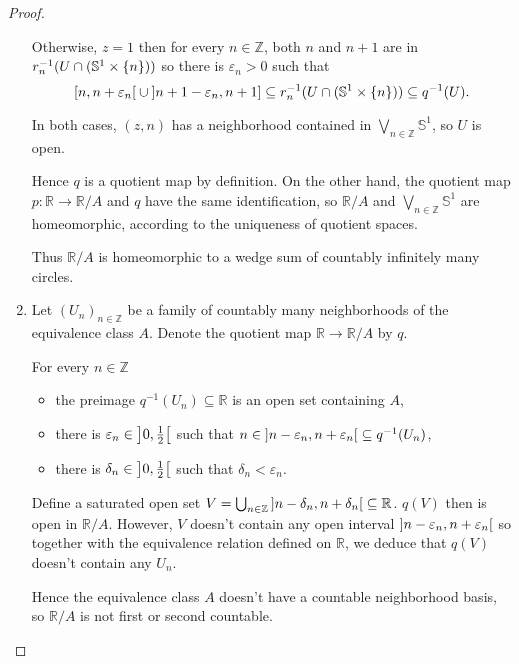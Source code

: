 \begin{proof}
\begin{enumerate}[label={(\alph*)}]
		      Otherwise, $z = 1$ then for every $n\in\mathbb{Z}$, both $n$ and $n+1$ are in $r_{n}^{-1}(U \cap (\mathbb{S}^{1}\times\left\{{n}\right\}))$ so there is $\varepsilon_{n} > 0$ such that
		      \begin{equation*}
			      \left[{n, n + \varepsilon_{n}}\right[ \cup \left]{n+1 - \varepsilon_{n}, n+1}\right] \subseteq r_{n}^{-1}(U \cap (\mathbb{S}^{1}\times\left\{{n}\right\})) \subseteq q^{-1}(U).
		      \end{equation*}

		      In both cases, $(z, n)$ has a neighborhood contained in $\bigvee_{n\in\mathbb{Z}}\mathbb{S}^{1}$, so $U$ is open.

		      Hence $q$ is a quotient map by definition. On the other hand, the quotient map $p: \mathbb{R} \to \mathbb{R}/A$ and $q$ have the same identification, so $\mathbb{R}/A$ and $\bigvee_{n\in \mathbb{Z}}\mathbb{S}^{1}$ are homeomorphic, according to the uniqueness of quotient spaces.

		      Thus $\mathbb{R}/A$ is homeomorphic to a wedge sum of countably infinitely many circles.
		\item Let ${(U_{n})}_{n\in\mathbb{Z}}$ be a family of countably many neighborhoods of the equivalence class $A$. Denote the quotient map $\mathbb{R}\to \mathbb{R}/A$ by $q$.

		      For every $n\in\mathbb{Z}$
		      \begin{itemize}
			      \item the preimage $q^{-1}(U_{n}) \subseteq \mathbb{R}$ is an open set containing $A$,
			      \item there is $\varepsilon_{n} \in \left]{0, \frac{1}{2}}\right[$ such that $n \in \left]{n - \varepsilon_{n}, n + \varepsilon_{n}}\right[ \subseteq q^{-1}(U_{n})$,
			      \item there is $\delta_{n} \in \left]{0, \frac{1}{2}}\right[$ such that $\delta_{n} < \varepsilon_{n}$.
		      \end{itemize}

		      Define a saturated open set $V = \bigcup_{n\in\mathbb{Z}} \left]{n - \delta_{n}, n + \delta_{n}}\right[ \subseteq \mathbb{R}$. $q(V)$ then is open in $\mathbb{R}/A$. However, $V$ doesn't contain any open interval $\left]{n - \varepsilon_{n}, n + \varepsilon_{n}}\right[$ so together with the equivalence relation defined on $\mathbb{R}$, we deduce that $q(V)$ doesn't contain any $U_{n}$.

		      Hence the equivalence class $A$ doesn't have a countable neighborhood basis, so $\mathbb{R}/A$ is not first or second countable.
	\end{enumerate}
\end{proof}
